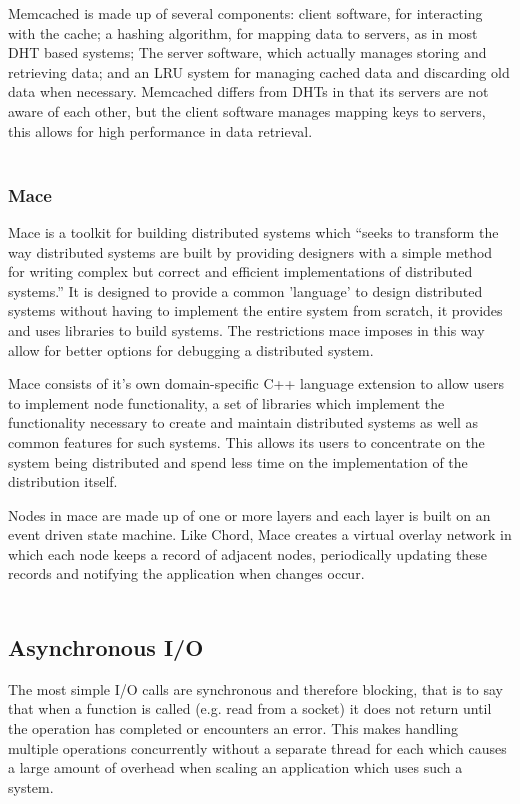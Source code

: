 \documentclass{article}
\begin{document}
Memcached is made up of several components: client software, for interacting with the cache; a hashing algorithm, for mapping data to servers, as in most DHT based systems; The server software, which actually manages storing and retrieving data; and an LRU system for managing cached data and discarding old data when necessary. Memcached differs from DHTs in that its servers are not aware of each other, but the client software manages mapping keys to servers, this allows for high performance in data retrieval.
\\
\\


\subsubsection{Mace} 
Mace\cite{mace} is a toolkit for building distributed systems which “seeks to transform the way distributed systems are built by providing designers with a simple method for writing complex but correct and efficient implementations of distributed systems.” \cite{mace_quote} It is designed to provide a common 'language' to design distributed systems without having to implement the entire system from scratch, it provides and uses libraries to build systems. The restrictions mace imposes in this way allow for better options for debugging a distributed system.

Mace consists of it's own domain-specific C++ language extension to allow users to implement node functionality, a set of libraries which implement the functionality necessary to create and maintain distributed systems as well as common features for such systems. This allows its users to concentrate on the system being distributed and spend less time on the implementation of the distribution itself.

Nodes in mace are made up of one or more layers and each layer is built on an event driven state machine. Like Chord, Mace creates a virtual overlay network in which each node keeps a record of adjacent nodes, periodically updating these records and notifying the application when changes occur.
\\
\\

\subsection{Asynchronous I/O}

The most simple I/O calls are synchronous and therefore blocking, that is to say that when a function is called (e.g. read from a socket) it does not return until the operation has completed or encounters an error. This makes handling multiple operations concurrently without a separate thread for each which causes a large amount of overhead when scaling an application which uses such a system.
\end{document}
